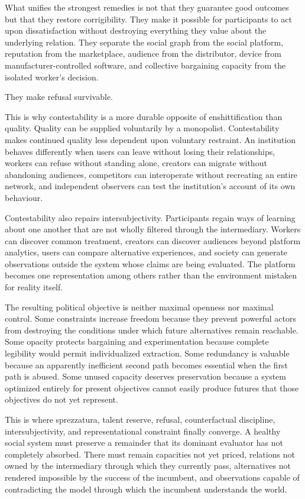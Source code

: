 \documentclass[11pt]{article}
\begin{document}
What unifies the strongest remedies is not that they guarantee good outcomes but that they restore corrigibility. They make it possible for participants to act upon dissatisfaction without destroying everything they value about the underlying relation. They separate the social graph from the social platform, reputation from the marketplace, audience from the distributor, device from manufacturer-controlled software, and collective bargaining capacity from the isolated worker's decision.

They make refusal survivable.

This is why contestability is a more durable opposite of enshittification than quality. Quality can be supplied voluntarily by a monopolist. Contestability makes continued quality less dependent upon voluntary restraint. An institution behaves differently when users can leave without losing their relationships, workers can refuse without standing alone, creators can migrate without abandoning audiences, competitors can interoperate without recreating an entire network, and independent observers can test the institution's account of its own behaviour.

Contestability also repairs intersubjectivity. Participants regain ways of learning about one another that are not wholly filtered through the intermediary. Workers can discover common treatment, creators can discover audiences beyond platform analytics, users can compare alternative experiences, and society can generate observations outside the system whose claims are being evaluated. The platform becomes one representation among others rather than the environment mistaken for reality itself.

The resulting political objective is neither maximal openness nor maximal control. Some constraints increase freedom because they prevent powerful actors from destroying the conditions under which future alternatives remain reachable. Some opacity protects bargaining and experimentation because complete legibility would permit individualized extraction. Some redundancy is valuable because an apparently inefficient second path becomes essential when the first path is abused. Some unused capacity deserves preservation because a system optimized entirely for present objectives cannot easily produce futures that those objectives do not yet represent.

This is where sprezzatura, talent reserve, refusal, counterfactual discipline, intersubjectivity, and representational constraint finally converge. A healthy social system must preserve a remainder that its dominant evaluator has not completely absorbed. There must remain capacities not yet priced, relations not owned by the intermediary through which they currently pass, alternatives not rendered impossible by the success of the incumbent, and observations capable of contradicting the model through which the incumbent understands the world.
\end{document}
